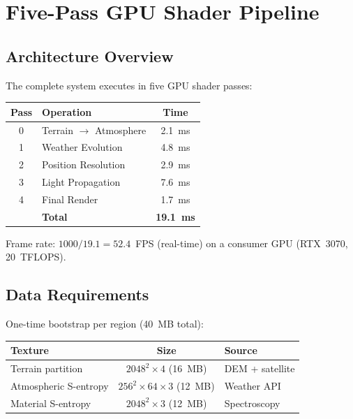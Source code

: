 \documentclass[10pt,twocolumn]{article}
\theoremstyle{definition}
\theoremstyle{remark}
\begin{document}
\section{Five-Pass GPU Shader Pipeline}\label{sec:pipeline}

\subsection{Architecture Overview}\label{sec:arch}

The complete system executes in five GPU shader passes:

\begin{center}
\small
\begin{tabular}{@{}clc@{}}
\toprule
\textbf{Pass} & \textbf{Operation} & \textbf{Time}\\
\midrule
0 & Terrain $\to$ Atmosphere & 2.1~ms\\
1 & Weather Evolution & 4.8~ms\\
2 & Position Resolution & 2.9~ms\\
3 & Light Propagation & 7.6~ms\\
4 & Final Render & 1.7~ms\\
\midrule
& \textbf{Total} & \textbf{19.1~ms}\\
\bottomrule
\end{tabular}
\end{center}

Frame rate: $1000/19.1 = 52.4$~FPS (real-time) on a consumer
GPU (RTX~3070, 20~TFLOPS).

\subsection{Data Requirements}\label{sec:data}

One-time bootstrap per region (40~MB total):

\begin{center}
\small
\begin{tabular}{@{}lcl@{}}
\toprule
\textbf{Texture} & \textbf{Size} & \textbf{Source}\\
\midrule
Terrain partition & $2048^2\times 4$ (16~MB) & DEM + satellite\\
Atmospheric S-entropy & $256^2\times 64\times 3$ (12~MB) & Weather API\\
Material S-entropy & $2048^2\times 3$ (12~MB) & Spectroscopy\\
\bottomrule
\end{tabular}
\end{center}
\end{document}
